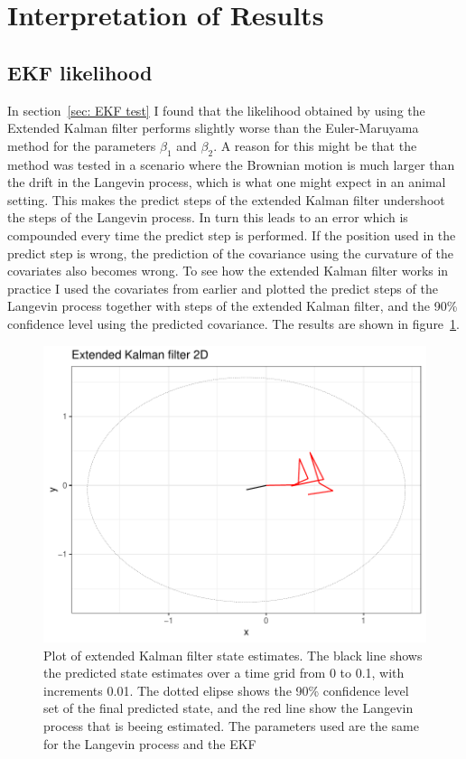

\section{Interpretation of Results}
\subsection{EKF likelihood}
 In section~\ref{sec: EKF test} I found that the likelihood obtained by using the Extended Kalman filter performs slightly worse than the Euler-Maruyama method for the parameters $\beta_1$ and $\beta_2$. A reason for this might be that the method was tested in a scenario where the Brownian motion is much larger than the drift in the Langevin process, which is what one might expect in an animal setting. This makes the predict steps of the extended Kalman filter undershoot the steps of the Langevin process. In turn this leads to an error which is compounded every time the predict step is performed. If the position used in the predict step is wrong, the prediction of the covariance using the curvature of the covariates also becomes wrong. To see how the extended Kalman filter works in practice I used the covariates from earlier and plotted the predict steps of the Langevin process together with steps of the extended Kalman filter, and the 90\% confidence level using the predicted covariance. The results are shown in figure~\ref{fig:EKF high diffusion}. 


\begin{figure}[H]
    \centering
    \includegraphics[width=\linewidth]{Images/discussion/EKF high diffusion path.pdf}
    \caption[Extended Kalman filter]{Plot of extended Kalman filter state estimates. The black line shows the predicted state estimates over a time grid from 0 to 0.1, with increments 0.01. The dotted elipse shows the 90\% confidence level set of the final predicted state, and the red line show the Langevin process that is beeing estimated. The parameters used are the same for the Langevin process and the EKF}
    \label{fig:EKF high diffusion}
\end{figure}

